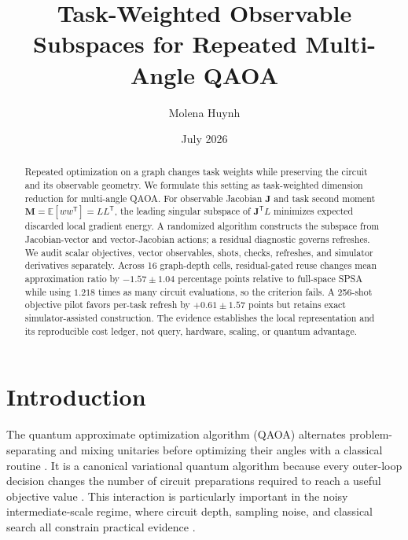 \documentclass[aps,prx,reprint,superscriptaddress,floatfix]{revtex4-2}
\newcommand{\E}{\mathbb{E}}
\newcommand{\J}{\mathbf{J}}
\newcommand{\M}{\mathbf{M}}
\newcommand{\trans}{\mathsf{T}}
\begin{document}
\title{Task-Weighted Observable Subspaces for Repeated Multi-Angle QAOA}
\author{Molena Huynh}
\date{July 2026}

\begin{abstract}
Repeated optimization on a graph changes task weights while preserving the
circuit and its observable geometry.  We formulate this setting as
task-weighted dimension reduction for multi-angle QAOA.  For observable
Jacobian $\J$ and task second moment
$\M=\E[ww^{\trans}]=LL^{\trans}$, the leading singular subspace of
$\J^{\trans}L$ minimizes expected discarded local gradient energy.  A
randomized algorithm constructs the subspace from Jacobian-vector and
vector-Jacobian actions; a residual diagnostic governs refreshes.  We audit
scalar objectives, vector observables, shots, checks, refreshes, and simulator
derivatives separately.  Across 16 graph-depth cells, residual-gated reuse
changes mean approximation ratio by $-1.57\pm1.04$ percentage points relative
to full-space SPSA while using $1.218$ times as many circuit evaluations, so
the criterion fails.  A 256-shot objective pilot favors per-task refresh by
$+0.61\pm1.57$ points but retains exact simulator-assisted construction.  The
evidence establishes the local representation and its reproducible cost
ledger, not query, hardware, scaling, or quantum advantage.
\end{abstract}
\maketitle

\section{Introduction}

The quantum approximate optimization algorithm (QAOA) alternates
problem-separating and mixing unitaries before optimizing their angles with a
classical routine \citep{farhi2014qaoa,hadfield2019alternating}.  It is a
canonical variational quantum algorithm because every outer-loop decision
changes the number of circuit preparations required to reach a useful
objective value \citep{peruzzo2014variational,mcclean2016theory}.  This
interaction is particularly important in the noisy intermediate-scale regime,
where circuit depth, sampling noise, and classical search all constrain
practical evidence \citep{preskill2018quantum,bharti2022noisy}.
\end{document}
